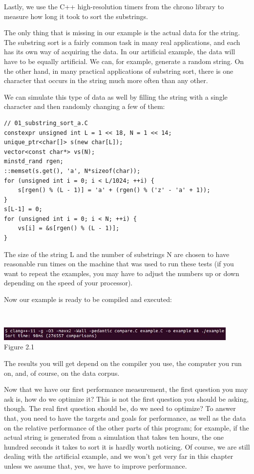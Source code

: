 Lastly, we use the C++ high-resolution timers from the chrono library to measure how long it took to sort the substrings.

The only thing that is missing in our example is the actual data for the string. The substring sort is a fairly common task in many real applications, and each has its own way of acquiring the data. In our artificial example, the data will have to be equally artificial. We can, for example, generate a random string. On the other hand, in many practical applications of substring sort, there is one character that occurs in the string much more often than any other.

We can simulate this type of data as well by filling the string with a single character and then randomly changing a few of them:

\begin{lstlisting}[style=styleCXX]
// 01_substring_sort_a.C
constexpr unsigned int L = 1 << 18, N = 1 << 14;
unique_ptr<char[]> s(new char[L]);
vector<const char*> vs(N);
minstd_rand rgen;
::memset(s.get(), 'a', N*sizeof(char));
for (unsigned int i = 0; i < L/1024; ++i) {
	s[rgen() % (L - 1)] = 'a' + (rgen() % ('z' - 'a' + 1));
}
s[L-1] = 0;
for (unsigned int i = 0; i < N; ++i) {
	vs[i] = &s[rgen() % (L - 1)];
}
\end{lstlisting}

The size of the string L and the number of substrings N are chosen to have reasonable run times on the machine that was used to run these tests (if you want to repeat the examples, you may have to adjust the numbers up or down depending on the speed of your processor).

Now our example is ready to be compiled and executed:

\hspace*{\fill} \\ %
\begin{center}
\includegraphics[width=0.9\textwidth]{content/1/chapter2/images/1.jpg}\\
Figure 2.1
\end{center}

The results you will get depend on the compiler you use, the computer you run on, and, of course, on the data corpus.

Now that we have our first performance measurement, the first question you may ask is, how do we optimize it? This is not the first question you should be asking, though. The real first question should be, do we need to optimize? To answer that, you need to have the targets and goals for performance, as well as the data on the relative performance of the other parts of this program; for example, if the actual string is generated from a simulation that takes ten hours, the one hundred seconds it takes to sort it is hardly worth noticing. Of course, we are still dealing with the artificial example, and we won't get very far in this chapter unless we assume that, yes, we have to improve performance.

